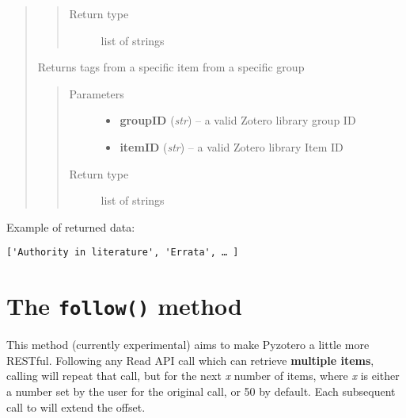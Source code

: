 \documentclass[letterpaper,10pt,english]{sphinxmanual}
\begin{document}
\begin{quote}
\begin{fulllineitems}
\begin{quote}
\begin{description}
\item[{Return type}] \leavevmode
list of strings

\end{description}\end{quote}

\end{fulllineitems}


\begin{fulllineitems}
\label{index:pyzotero.zotero.Zotero.group_item_tags}
Returns tags from a specific item from a specific group
\begin{quote}\begin{description}
\item[{Parameters}] \leavevmode\begin{itemize}
\item {} 
\textbf{groupID} (\emph{str}) -- a valid Zotero library group ID

\item {} 
\textbf{itemID} (\emph{str}) -- a valid Zotero library Item ID

\end{itemize}

\item[{Return type}] \leavevmode
list of strings

\end{description}\end{quote}

\end{fulllineitems}

\end{quote}

Example of returned data:

\begin{Verbatim}[commandchars=\\\{\}]
['Authority in literature', 'Errata', … ]
\end{Verbatim}


\section{The \texttt{follow()} method}
\label{index:the-follow-method}
This method (currently experimental) aims to make Pyzotero a little more RESTful. Following any Read API call which can retrieve \textbf{multiple items}, calling  will repeat that call, but for the next \emph{x} number of items, where \emph{x} is either a number set by the user for the original call, or 50 by default. Each subsequent call to  will extend the offset.
\end{document}

